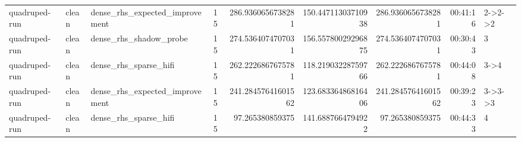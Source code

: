 \begin{tabular}{llllrrrrl}
quadruped-run & clean & dense\_rhs\_expected\_improvement & 15 & 286.9360656738281 & 150.44711303710938 & 286.9360656738281 & 00:41:16 & 2->2->2 \\
quadruped-run & clean & dense\_rhs\_shadow\_probe & 15 & 274.5364074707031 & 156.55780029296875 & 274.5364074707031 & 00:30:43 & 3 \\
quadruped-run & clean & dense\_rhs\_sparse\_hifi & 15 & 262.2226867675781 & 118.21903228759766 & 262.2226867675781 & 00:44:08 & 3->4 \\
quadruped-run & clean & dense\_rhs\_expected\_improvement & 15 & 241.28457641601562 & 123.68336486816406 & 241.28457641601562 & 00:39:23 & 3->3->3 \\
quadruped-run & clean & dense\_rhs\_sparse\_hifi & 15 & 97.265380859375 & 141.6887664794922 & 97.265380859375 & 00:44:33 & 4 \\
\bottomrule
\end{tabular}
